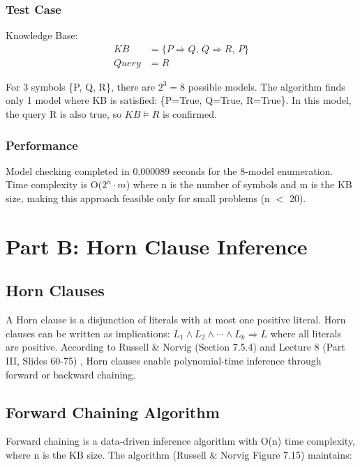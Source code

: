 \documentclass[letterpaper]{article}
\begin{document}
\subsubsection{Test Case}

Knowledge Base:
\begin{align*}
KB &= \{P \Rightarrow Q, \, Q \Rightarrow R, \, P\}\\
Query &= R
\end{align*}

For 3 symbols \{P, Q, R\}, there are $2^3 = 8$ possible models. The algorithm finds only 1 model where KB is satisfied: \{P=True, Q=True, R=True\}. In this model, the query R is also true, so $KB \models R$ is confirmed.

\subsubsection{Performance}

Model checking completed in 0.000089 seconds for the 8-model enumeration. Time complexity is O($2^n \cdot m$) where n is the number of symbols and m is the KB size, making this approach feasible only for small problems (n $<$ 20).

\section{Part B: Horn Clause Inference}

\subsection{Horn Clauses}

A Horn clause is a disjunction of literals with at most one positive literal. Horn clauses can be written as implications: $L_1 \wedge L_2 \wedge \cdots \wedge L_k \Rightarrow L$ where all literals are positive. According to Russell \& Norvig (Section 7.5.4) and Lecture 8 (Part III, Slides 60-75) \cite{russell2020artificial,atyabi2025lecture8}, Horn clauses enable polynomial-time inference through forward or backward chaining.

\subsection{Forward Chaining Algorithm}

Forward chaining is a data-driven inference algorithm with O(n) time complexity, where n is the KB size. The algorithm (Russell \& Norvig Figure 7.15) maintains:
\end{document}
